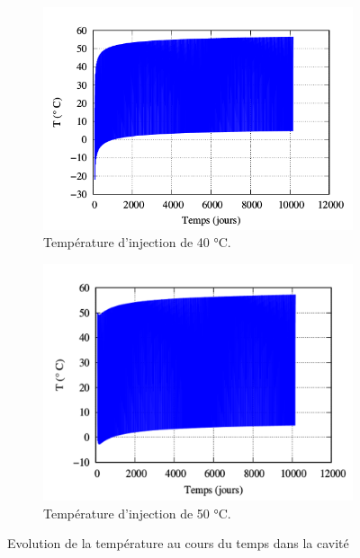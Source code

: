 \documentclass[11pt,french,a4paper]{article}
\begin{document}
\begin{figure}[h!]
  \centering
  \begin{subfigure}[b]{0.43\linewidth}
    \includegraphics[width=\linewidth]{image/chap2/Cavité minée GH2 P2I température au cours du temps 40°C.png}
    \caption{Température d’injection de 40 °C.}
  \end{subfigure}
  \begin{subfigure}[b]{0.4\linewidth}
    \includegraphics[width=\linewidth]{image/chap2/Cavité minée GH2 P2I température au cours temps 50°C.png}
    \caption{Température d'injection de 50 °C.}
  \end{subfigure}
  \caption{Evolution de la température au cours du temps dans la cavité}
  \label{fig:température}
\end{figure}
\end{document}
